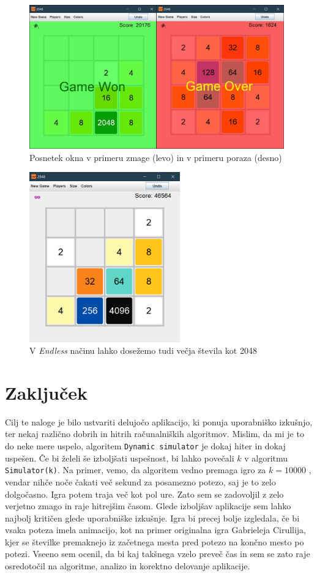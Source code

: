 \documentclass{article}
\begin{document}
\begin{figure}[ht!]
\centering
\includegraphics[width=11cm]{scr3.png}
\caption{Posnetek okna v primeru zmage (levo) in v primeru poraza (desno)}
\label{scr3}
\end{figure}

\begin{figure}[ht!]
\centering
\includegraphics[width=6.5cm]{scr4.jpg}
\caption{V \emph{Endless} načinu lahko dosežemo tudi večja števila kot 2048}
\label{scr4}
\end{figure}


\section{Zaključek}

Cilj te naloge je bilo ustvariti delujočo aplikacijo, ki ponuja uporabniško izkušnjo, ter nekaj različno dobrih in hitrih računalniških algoritmov. Mislim, da mi je to do neke mere uspelo, algoritem \texttt{Dynamic simulator} je dokaj hiter in dokaj uspešen. Če bi želeli še izboljšati uspešnost, bi lahko povečali $k$ v algoritmu \texttt{Simulator(k)}. Na primer, vemo, da algoritem vedno premaga igro za $k=10000$ \cite{stackoverflow}, vendar nihče noče čakati več sekund za posamezno potezo, saj je to zelo dolgočasno. Igra potem traja več kot pol ure. Zato sem se zadovoljil z zelo verjetno zmago in raje hitrejšim časom. Glede izboljšav aplikacije sem lahko najbolj kritičen glede uporabniške izkušnje. Igra bi precej bolje izgledala, če bi vsaka poteza imela animacijo, kot na primer originalna igra Gabrieleja Cirullija, kjer se številke premaknejo iz začetnega mesta pred potezo na končno mesto po potezi. Vseeno sem ocenil, da bi kaj takšnega vzelo preveč čas in sem se zato raje osredotočil na algoritme, analizo in korektno delovanje aplikacije.
\end{document}
